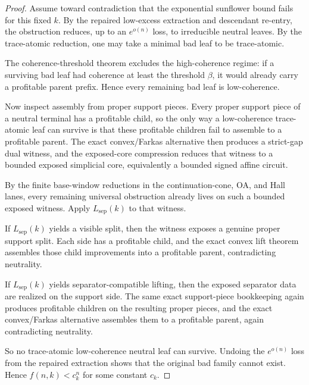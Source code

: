 \documentclass[11pt]{article}
\theoremstyle{definition}
\newcommand{\1}{\mathbf{1}}
\begin{document}
\begin{proof}
Assume toward contradiction that the exponential sunflower bound fails for this fixed $k$. By the repaired low-excess extraction and descendant re-entry, the obstruction reduces, up to an $e^{o(n)}$ loss, to irreducible neutral leaves. By the trace-atomic reduction, one may take a minimal bad leaf to be trace-atomic.

The coherence-threshold theorem excludes the high-coherence regime: if a surviving bad leaf had coherence at least the threshold $\beta$, it would already carry a profitable parent prefix. Hence every remaining bad leaf is low-coherence.

Now inspect assembly from proper support pieces. Every proper support piece of a neutral terminal has a profitable child, so the only way a low-coherence trace-atomic leaf can survive is that these profitable children fail to assemble to a profitable parent. The exact convex/Farkas alternative then produces a strict-gap dual witness, and the exposed-core compression reduces that witness to a bounded exposed simplicial core, equivalently a bounded signed affine circuit.

By the finite base-window reductions in the continuation-cone, OA, and Hall lanes, every remaining universal obstruction already lives on such a bounded exposed witness. Apply $L_{\mathrm{sep}}(k)$ to that witness.

If $L_{\mathrm{sep}}(k)$ yields a visible split, then the witness exposes a genuine proper support split. Each side has a profitable child, and the exact convex lift theorem assembles those child improvements into a profitable parent, contradicting neutrality.

If $L_{\mathrm{sep}}(k)$ yields separator-compatible lifting, then the exposed separator data are realized on the support side. The same exact support-piece bookkeeping again produces profitable children on the resulting proper pieces, and the exact convex/Farkas alternative assembles them to a profitable parent, again contradicting neutrality.

So no trace-atomic low-coherence neutral leaf can survive. Undoing the $e^{o(n)}$ loss from the repaired extraction shows that the original bad family cannot exist. Hence $f(n,k)<c_k^n$ for some constant $c_k$.
\end{proof}
\end{document}
